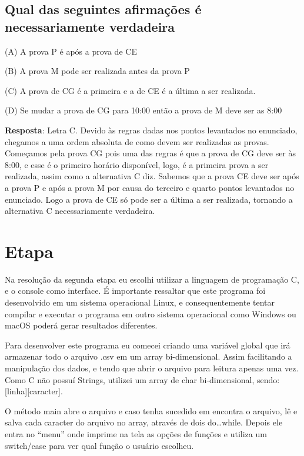 \documentclass[11pt]{article}
\begin{document}
\subsection{Qual das seguintes afirmações é necessariamente verdadeira}
\label{sec:orga8e4d7f}

(A) A prova P é após a prova de CE

(B) A prova M pode ser realizada antes da prova P

(C) A prova de CG é a primeira e a de CE é a última a ser realizada.

(D) Se mudar a prova de CG para 10:00 então a prova de M deve ser as 8:00

\textbf{Resposta}: Letra C. Devido às regras dadas nos pontos levantados no enunciado, chegamos a uma ordem absoluta de como devem ser realizadas as provas. Começamos pela prova CG pois uma das regras é que a prova de CG deve ser às 8:00, e esse é o primeiro horário disponível, logo, é a primeira prova a ser realizada, assim como a alternativa C diz. Sabemos que a prova CE deve ser após a prova P e após a prova M por causa do terceiro e quarto pontos levantados no enunciado. Logo a prova de CE só pode ser a última a ser realizada, tornando a alternativa C necessariamente verdadeira.

\section{Etapa}
\label{sec:orgc6716c9}
Na resolução da segunda etapa eu escolhi utilizar a linguagem de programação C, e o console como interface. É importante ressaltar que este programa foi desenvolvido em um sistema operacional Linux, e consequentemente tentar compilar e executar o programa em outro sistema operacional como Windows ou macOS poderá gerar resultados diferentes.

Para desenvolver este programa eu comecei criando uma variável global que irá armazenar todo o arquivo .csv em um array bi-dimensional. Assim facilitando a manipulação dos dados, e tendo que abrir o arquivo para leitura apenas uma vez. Como C não possuí Strings, utilizei um array de char bi-dimensional, sendo: [linha][caracter].

O método main abre o arquivo e caso tenha sucedido em encontra o arquivo, lê e salva cada caracter do arquivo no array, através de dois do\ldots{}while. Depois ele entra no ``menu'' onde imprime na tela as opções de funções e utiliza um switch/case para ver qual função o usuário escolheu.
\end{document}
